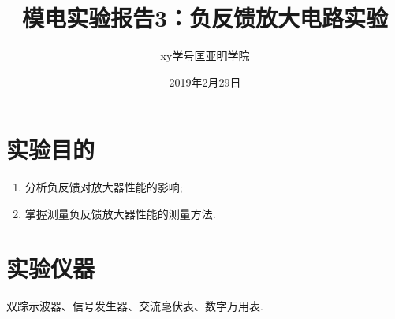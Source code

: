 \documentclass[a4paper]{article}
\title{模电实验报告3：负反馈放大电路实验}
\author{xy\quad 学号\quad 匡亚明学院}
\date{2019年2月29日}
\begin{document}
\maketitle


\section{实验目的}
\begin{enumerate}
\item 分析负反馈对放大器性能的影响;
\item 掌握测量负反馈放大器性能的测量方法.
\end{enumerate}

\section{实验仪器}
双踪示波器、信号发生器、交流毫伏表、数字万用表.
\end{document}
